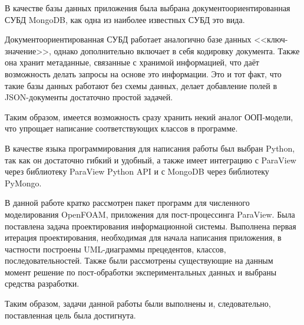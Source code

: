 \documentclass[14pt]{extreport}
\begin{document}
В качестве базы данных приложения была выбрана документоориентированная СУБД MongoDB, как одна из наиболее известных СУБД это вида. 

Документоориентированная СУБД работает аналогично базе данных <<ключ-значение>>, однако дополнительно включает в себя кодировку документа. Также она хранит метаданные, связанные с хранимой информацией, что даёт возможность делать запросы на основе это информации. 
Это и тот факт, что такие базы данных работают без схемы данных, делает добавление полей в JSON-документы достаточно простой задачей. 

Таким образом, имеется возможность сразу хранить некий аналог ООП-модели, что упрощает написание соответствующих классов в программе.

В качестве языка программирования для написания работы был выбран Python, так как он достаточно гибкий и удобный, а также имеет интеграцию с ParaView через библиотеку ParaView Python API и с MongoDB через библиотеку PyMongo. 


\conclusions

В данной работе кратко рассмотрен пакет программ для численного моделирования OpenFOAM, приложения для пост-процессинга ParaView. Была поставлена задача проектирования информационной системы. Выполнена первая итерация проектирования, необходимая для начала написания приложения, в частности построены UML-диаграммы прецедентов, классов, последовательностей. Также были рассмотрены существующие на данным момент решение по пост-обработки экспериментальных данных и выбраны средства разработки.

Таким образом, задачи данной работы были выполнены и, следовательно, поставленная цель была достигнута. 


% 
\end{document}
